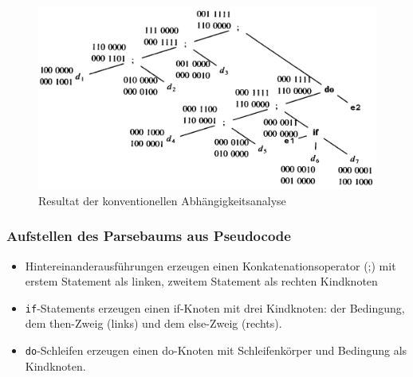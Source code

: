 \begin{figure}[p]
  \centering
  \includegraphics[scale=0.2]{images/bild2-1.png}
  \caption{Resultat der konventionellen Abhängigkeitsanalyse}
  \label{fig:resultat}
\end{figure}

\subsubsection{Aufstellen des Parsebaums aus Pseudocode}

\begin{itemize}
    \item Hintereinanderausführungen erzeugen einen Konkatenationsoperator (;) mit
        erstem Statement als linken, zweitem Statement als rechten Kindknoten
    \item \texttt{if}-Statements erzeugen einen if-Knoten mit drei Kindknoten:
        der Bedingung, dem then-Zweig (links) und dem else-Zweig (rechts).
    \item \texttt{do}-Schleifen erzeugen einen do-Knoten mit Schleifenkörper und
        Bedingung als Kindknoten.
\end{itemize}


